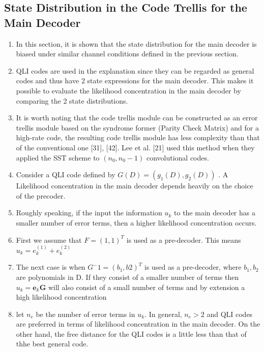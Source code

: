 \documentclass[fontsize=12pt]{article}
\theoremstyle{definition}
\begin{document}
\subsection{State Distribution in the Code Trellis for the Main Decoder}
\begin{enumerate}
\item In this section, it is shown that the state distribution for the main decoder is biased under similar channel conditions defined in the previous section. 

\item QLI codes are used in the explanation since they can be regarded as general codes and thus have 2 state expressions for the main decoder. This makes it possible to evaluate the likelihood concentration in the main decoder by comparing the 2 state distributions.

\item It is worth noting that the code trellis module can be constructed
as an error trellis module based on the syndrome
former (Parity Check Matrix) and for a high-rate code, the resulting code
trellis module has less complexity than that of the conventional
one [31], [42]. Lee et al. [21] used this method when they
applied the SST scheme to $(n_0, n_0-1)$ convolutional codes.

\item Consider a QLI code defined by $G(D) =(g_1(D),g_2(D))$ . A Likelihood concentration in the main decoder depends heavily on the choice of the precoder.

\item Roughly speaking, if the input the information $u_k$ to the main decoder has a smaller number of error terms, then a higher likelihood concentration occurs.

\item First we assume that $F=(1,1)^T$ is used as a pre-decoder. This means $u_k =e_k^{(1)}+e_k^{(2)}$

\item The next case is when $G^-1 =(b_1, b2)^T$ is used as a pre-decoder, where $b_1,b_2$ are polynomials in D. If they consist of a smaller number of terms then $u_k = \mathbf{e}_k\mathbf{G}$ will also consist of a small number of terms and by extension a high likelihood concentration

\item let $n_e$ be the number of error terms in $u_k$. In general, $n_e>2$ and QLI codes are preferred in terms of likelihood concentration in the main decoder. On the other hand, the free distance for the QLI codes is a little less than that of thhe best general code.


\end{enumerate}
\end{document}
